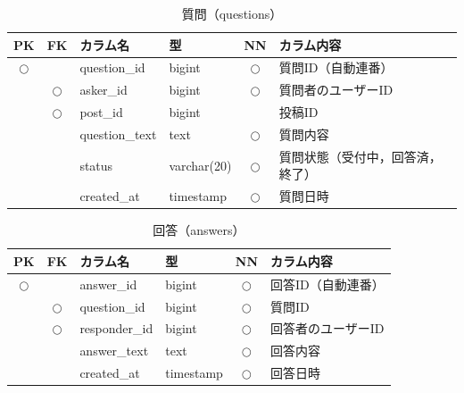 
\begin{table}[H]
    \centering
    \caption{質問（questions）}
    \label{tab:db_questions}
    \small
    \begin{tabularx}{\textwidth}{|c|c|l|l|c|X|}
        \hline
        PK & FK & カラム名 & 型 & NN & カラム内容 \\ \hline
        $\bigcirc$ & & question\_id & bigint & $\bigcirc$ & 質問ID（自動連番） \\ \hline
        & $\bigcirc$ & asker\_id & bigint & $\bigcirc$ & 質問者のユーザーID \\ \hline
        & $\bigcirc$ & post\_id & bigint & & 投稿ID \\ \hline
        & & question\_text & text & $\bigcirc$ & 質問内容 \\ \hline
        & & status & varchar(20) & $\bigcirc$ & 質問状態（受付中，回答済，終了） \\ \hline
        & & created\_at & timestamp & $\bigcirc$ & 質問日時 \\ \hline
    \end{tabularx}
\end{table}



\begin{table}[H]
    \centering
    \caption{回答（answers）}
    \label{tab:db_answers}
    \small
    \begin{tabularx}{\textwidth}{|c|c|l|l|c|X|}
        \hline
        PK & FK & カラム名 & 型 & NN & カラム内容 \\ \hline
        $\bigcirc$ & & answer\_id & bigint & $\bigcirc$ & 回答ID（自動連番） \\ \hline
        & $\bigcirc$ & question\_id & bigint & $\bigcirc$ & 質問ID \\ \hline
        & $\bigcirc$ & responder\_id & bigint & $\bigcirc$ & 回答者のユーザーID \\ \hline
        & & answer\_text & text & $\bigcirc$ & 回答内容 \\ \hline
        & & created\_at & timestamp & $\bigcirc$ & 回答日時 \\ \hline
    \end{tabularx}
\end{table}



